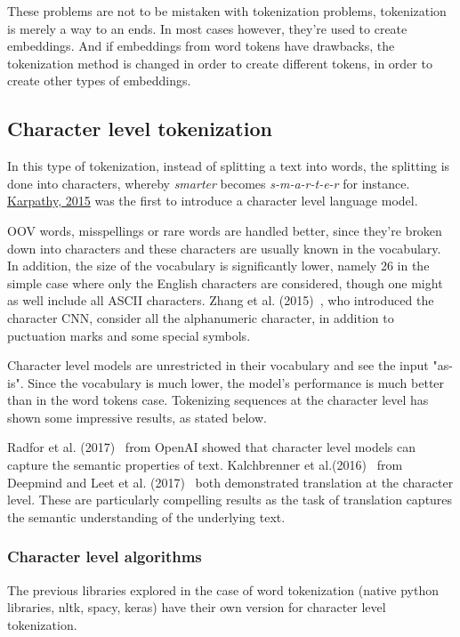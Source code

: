 These problems are not to be mistaken with tokenization problems, tokenization is merely a way to an ends. In most cases however, they're used to create embeddings. And if embeddings from word tokens have drawbacks, the tokenization method is changed in order to create different tokens, in order to create other types of embeddings.
    
\subsection{Character level tokenization}

In this type of tokenization, instead of splitting a text into words, the splitting is done into characters, whereby \emph{smarter} becomes \emph{s-m-a-r-t-e-r} for instance. \href{https://github.com/karpathy/char-rnn}{Karpathy, 2015} was the first to introduce a character level language model.

OOV words, misspellings or rare words are handled better, since they're broken down into characters and these characters are usually known in the vocabulary. In addition, the size of the vocabulary is significantly lower, namely 26 in the simple case where only the English characters are considered, though one might as well include all ASCII characters. Zhang et al. (2015)~\cite{zhang2015text}, who introduced the character CNN, consider all the alphanumeric character, in addition to puctuation marks and some special symbols.

Character level models are unrestricted in their vocabulary and see the input "as-is". Since the vocabulary is much lower, the model's performance is much better than in the word tokens case. Tokenizing sequences at the character level has shown some impressive results, as stated below.

Radfor et al. (2017)~\cite{radford2017learning} from OpenAI showed that character level models can capture the semantic properties of text. Kalchbrenner et al.(2016)~\cite{kalchbrenner2016neural} from Deepmind and Leet et al. (2017)~\cite{lee-etal-2017-fully} both demonstrated translation at the character level. These are particularly compelling results as the task of translation captures the semantic understanding of the underlying text.

\subsubsection{Character level algorithms}

The previous libraries explored in the case of word tokenization (native python libraries, nltk, spacy, keras) have their own version for character level tokenization.

